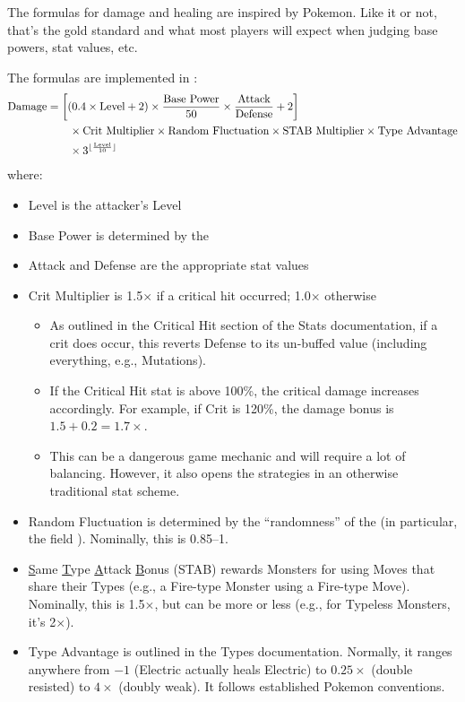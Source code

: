 The formulas for damage and healing are inspired by Pokemon. Like it or not, that's the gold standard and what most players will expect when judging base powers, stat values, etc.

The formulas are implemented in :
\begin{align*}
	\text{Damage} &= \left[\left(0.4\times \text{Level} + 2\right) \times \frac{\text{Base Power}}{50} \times \frac{\text{Attack}}{\text{Defense}} + 2\right]\\
		& \qquad \times \text{Crit Multiplier} \times \text{Random Fluctuation} \times \text{STAB Multiplier} \times \text{Type Advantage}\\
		& \qquad \times 3^{\lfloor\frac{\text{Level}}{10}\rfloor}
\end{align*}
where:
\begin{itemize}
	\item{Level is the attacker's Level}
	\item{Base Power is determined by the }
	\item{Attack and Defense are the appropriate stat values}
	\item{Crit Multiplier is 1.5$\times$ if a critical hit occurred; 1.0$\times$ otherwise
		\begin{itemize}
			\item{As outlined in the Critical Hit section of the Stats documentation, if a crit does occur, this reverts Defense to its un-buffed value (including everything, e.g., Mutations).}
			\item{If the Critical Hit stat is above 100\%, the critical damage increases accordingly. For example, if Crit is 120\%, the damage bonus is $1.5 + 0.2 = 1.7\times$.}
			\item{This can be a dangerous game mechanic and will require a lot of balancing. However, it also opens the strategies in an otherwise traditional stat scheme.}
		\end{itemize}
	}
	\item{Random Fluctuation is determined by the ``randomness'' of the  (in particular, the field ). Nominally, this is 0.85--1.}
	\item{\ul{S}ame \ul{T}ype \ul{A}ttack \ul{B}onus (STAB) rewards Monsters for using Moves that share their Types (e.g., a Fire-type Monster using a Fire-type Move). Nominally, this is 1.5$\times$, but can be more or less (e.g., for Typeless Monsters, it's 2$\times$).}
	\item{Type Advantage is outlined in the Types documentation. Normally, it ranges anywhere from $-1$ (Electric actually heals Electric) to $0.25\times$ (double resisted) to $4\times$ (doubly weak). It follows established Pokemon conventions.}
\end{itemize}
